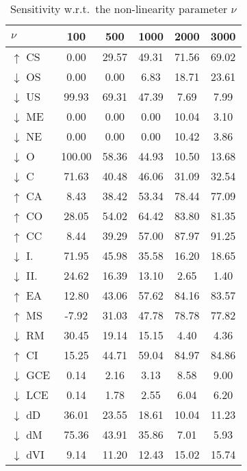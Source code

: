 \documentclass[journal]{IEEEtran}
\begin{document}
\begin{table}
	\centering
	\caption{Sensitivity w.r.t.\ the non-linearity parameter $\nu$}
	\begin{tabular}{@{} l *{5}{S[table-format=2.3,detect-inline-weight=math,table-align-text-post=false]} @{}}
		\toprule
		{$\nu$} 		 & {100} & {500} & {1000} & {2000} & {3000}   \\
		\midrule
		$\uparrow$ CS    & 0.00 & 29.57 & 49.31 & 71.56 & 69.02 \\
		$\downarrow$ OS  & 0.00 & 0.00 & 6.83 & 18.71 & 23.61 \\
		$\downarrow$ US  & 99.93 & 69.31 & 47.39 & 7.69 & 7.99 \\
		$\downarrow$ ME  & 0.00 & 0.00 & 0.00 & 10.04 & 3.10 \\
		$\downarrow$ NE  & 0.00 & 0.00 & 0.00 & 10.42 & 3.86 \\
		$\downarrow$ O   & 100.00 & 58.36 & 44.93 & 10.50 & 13.68 \\
		$\downarrow$ C   & 71.63 & 40.48 & 46.06 & 31.09 & 32.54 \\
		$\uparrow$ CA    & 8.43 & 38.42 & 53.34 & 78.44 & 77.09 \\
		$\uparrow$ CO    & 28.05 & 54.02 & 64.42 & 83.80 & 81.35 \\
		$\uparrow$ CC    & 8.44 & 39.29 & 57.00 & 87.97 & 91.25 \\
		$\downarrow$ I.  & 71.95 & 45.98 & 35.58 & 16.20 & 18.65 \\
		$\downarrow$ II. & 24.62 & 16.39 & 13.10 & 2.65 & 1.40 \\
		$\uparrow$ EA    & 12.80 & 43.06 & 57.62 & 84.16 & 83.57 \\
		$\uparrow$ MS    & -7.92 & 31.03 & 47.78 & 78.78 & 77.82 \\
		$\downarrow$ RM  & 30.45 & 19.14 & 15.15 & 4.40 & 4.36 \\
		$\uparrow$ CI    & 15.25 & 44.71 & 59.04 & 84.97 & 84.86 \\
		$\downarrow$ GCE & 0.14 & 2.16 & 3.13 & 8.58 & 9.00 \\
		$\downarrow$ LCE & 0.14 & 1.78 & 2.55 & 6.04 & 6.20 \\
		$\downarrow$ dD  & 36.01 & 23.55 & 18.61 & 10.04 & 11.23 \\
		$\downarrow$ dM  & 75.36 & 43.91 & 35.86 & 7.01 & 5.93 \\
		$\downarrow$ dVI & 9.14 & 11.20 & 12.43 & 15.02 & 15.74 \\
		\bottomrule
	\end{tabular}
	\label{tbl:paramsense_sparsity_nu}
\end{table}
\end{document}

